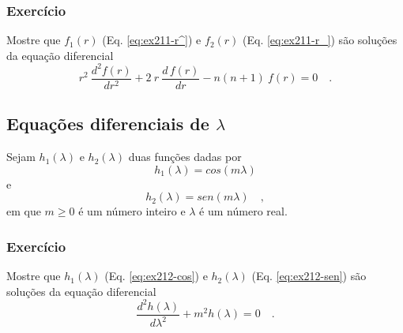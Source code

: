 \documentclass[10pt,a4paper,fleqn]{article}
\begin{document}
\begin{flushleft}
\dotfill
\end{flushleft}

\subsubsection{Exerc\'{i}cio}

Mostre que $f_{1}(r)$ (Eq. \ref{eq:ex211-r^}) e $f_{2}(r)$ (Eq. \ref{eq:ex211-r_}) 
s\~{a}o soluç\~{o}es da equaç\~{a}o diferencial
\begin{equation}
r^{2} \: \frac{d^{2} f(r)}{d r^{2}} + 2 \: r \: \frac{d \, f(r)}{d r} - n(n+1) \: f(r) = 0 \quad .
\label{eq:ex211-eqdif-r}
\end{equation}

\begin{flushleft}
\dotfill
\end{flushleft}

\subsection{Equaç\~{o}es diferenciais de $\lambda$}

Sejam $h_{1}(\lambda)$ e $h_{2}(\lambda)$ duas funç\~{o}es dadas por
\begin{equation}
h_{1}(\lambda) = cos(m \lambda)
\label{eq:ex212-cos}
\end{equation}
e
\begin{equation}
h_{2}(\lambda) = sen(m \lambda) \quad ,
\label{eq:ex212-sen}
\end{equation}
em que $m \geqslant 0$ \'{e} um n\'{u}mero inteiro e $\lambda$ \'{e} um n\'{u}mero real. 

\begin{flushleft}
\dotfill
\end{flushleft}

\subsubsection{Exerc\'{i}cio}

Mostre que
$h_{1}(\lambda)$ (Eq. \ref{eq:ex212-cos}) e $h_{2}(\lambda)$ (Eq. \ref{eq:ex212-sen}) 
s\~{a}o soluç\~{o}es da equaç\~{a}o diferencial
\begin{equation}
\frac{d^{2} h(\lambda)}{d \lambda^{2}} + m^{2} h(\lambda) = 0 \quad .
\label{eq:ex212-eqdif-lamb}
\end{equation}

\begin{flushleft}
\dotfill
\end{flushleft}
\end{document}
